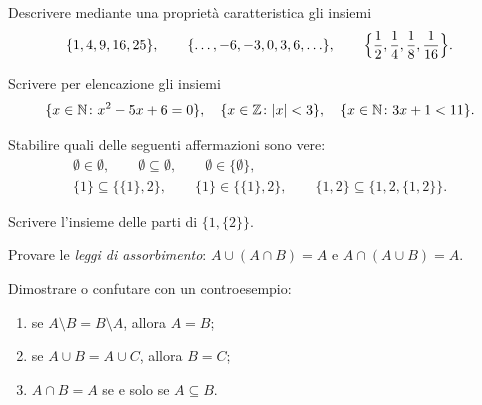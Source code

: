 \begin{esercizio}[\liv{1}]
Descrivere mediante una propriet\`a caratteristica gli insiemi
\[
\{1,4,9,16,25\},\qquad\{\ldots,-6,-3,0,3,6,\ldots\},\qquad\Bigl\{\frac12,\frac14,\frac18,\frac1{16}\Bigr\}.
\]
\end{esercizio}

\begin{esercizio}[\liv{1}]
Scrivere per elencazione gli insiemi
\[
\{x\in\mathbb N\colon x^{2}-5x+6=0\},\quad\{x\in\mathbb Z\colon |x|<3\},\quad\{x\in\mathbb N\colon 3x+1<11\}.
\]
\end{esercizio}

\begin{esercizio}[\liv{1}]
Stabilire quali delle seguenti affermazioni sono vere:
\begin{gather*}
\emptyset\in\emptyset,\qquad\emptyset\subseteq\emptyset,\qquad\emptyset\in\{\emptyset\},\\
\{1\}\subseteq\{\{1\},2\},\qquad\{1\}\in\{\{1\},2\},\qquad\{1,2\}\subseteq\{1,2,\{1,2\}\}.
\end{gather*}
\end{esercizio}

\begin{esercizio}[\liv{2}]
Scrivere l'insieme delle parti di $\{1,\{2\}\}$.
\end{esercizio}

\begin{esercizio}[\liv{2}]
Provare le \textit{leggi di assorbimento}: $A\cup(A\cap B)=A$ e $A\cap(A\cup B)=A$.
\end{esercizio}

\begin{esercizio}[\liv{2}]
Dimostrare o confutare con un controesempio:
\begin{enumerate}
\item se $A\setminus B=B\setminus A$, allora $A=B$;
\item se $A\cup B=A\cup C$, allora $B=C$;
\item $A\cap B=A$ se e solo se $A\subseteq B$.
\end{enumerate}
\end{esercizio}

